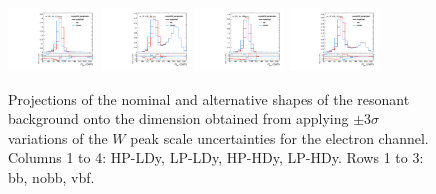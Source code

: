 \begin{figure}[htbp]
  \includegraphics[width=0.21\textwidth]{fig/uncertainties/systs_res_e_HP_vbf_LDy_scaleWY_ProjY.pdf}
  \includegraphics[width=0.21\textwidth]{fig/uncertainties/systs_res_e_LP_vbf_LDy_scaleWY_ProjY.pdf}
  \includegraphics[width=0.21\textwidth]{fig/uncertainties/systs_res_e_HP_vbf_HDy_scaleWY_ProjY.pdf}
  \includegraphics[width=0.21\textwidth]{fig/uncertainties/systs_res_e_LP_vbf_HDy_scaleWY_ProjY.pdf}\\
  \caption{
    Projections of the nominal and alternative shapes of the resonant background onto the \MJ dimension obtained from applying $\pm3\sigma$ variations of the $W$ peak scale uncertainties for the electron channel.
    Columns 1 to 4: HP-LDy, LP-LDy, HP-HDy, LP-HDy.
    Rows 1 to 3: bb, nobb, vbf.
  }
  \label{fig:systResMJ_scaleWY}
\end{figure}

